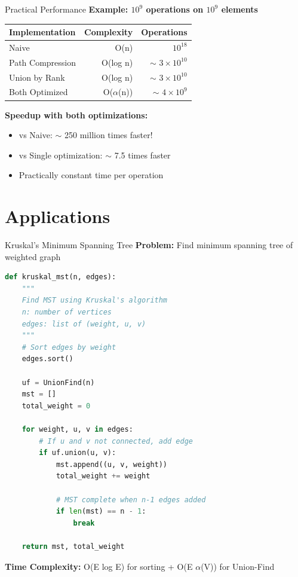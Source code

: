 \documentclass[aspectratio=169]{beamer}
\begin{document}
\begin{frame}{Practical Performance}
  \textbf{Example: $10^9$ operations on $10^9$ elements}

  \vspace{0.5cm}
  \begin{table}
    \centering
    \begin{tabular}{|l|r|r|}
      \hline
      \textbf{Implementation} & \textbf{Complexity} & \textbf{Operations} \\
      \hline
      Naive & O(n) & $10^{18}$ \\
      \hline
      Path Compression & O(log n) & $\sim$ $3 \times 10^{10}$ \\
      \hline
      Union by Rank & O(log n) & $\sim$ $3 \times 10^{10}$ \\
      \hline
      Both Optimized & O($\alpha$(n)) & $\sim$ $4 \times 10^9$ \\
      \hline
    \end{tabular}
  \end{table}

  \vspace{0.5cm}
  \textbf{Speedup with both optimizations:}
  \begin{itemize}
    \item vs Naive: $\sim$ 250 million times faster!
    \item vs Single optimization: $\sim$ 7.5 times faster
    \item Practically constant time per operation
  \end{itemize}
\end{frame}

\section{Applications}

\begin{frame}[fragile]{Kruskal's Minimum Spanning Tree}
  \textbf{Problem:} Find minimum spanning tree of weighted graph

  \begin{lstlisting}[language=Python, basicstyle=\ttfamily\footnotesize]
def kruskal_mst(n, edges):
    """
    Find MST using Kruskal's algorithm
    n: number of vertices
    edges: list of (weight, u, v)
    """
    # Sort edges by weight
    edges.sort()

    uf = UnionFind(n)
    mst = []
    total_weight = 0

    for weight, u, v in edges:
        # If u and v not connected, add edge
        if uf.union(u, v):
            mst.append((u, v, weight))
            total_weight += weight

            # MST complete when n-1 edges added
            if len(mst) == n - 1:
                break

    return mst, total_weight
  \end{lstlisting}

  \textbf{Time Complexity:} O(E log E) for sorting + O(E $\alpha$(V)) for Union-Find
\end{frame}
\end{document}
